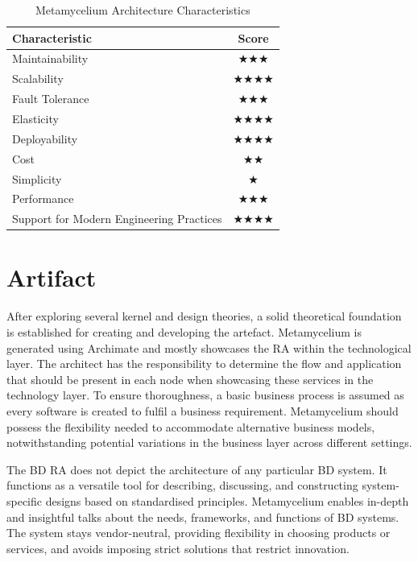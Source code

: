 \documentclass[preprint,12pt]{elsarticle}
\begin{document}
\begin{table}[t]
  \centering
  \caption{Metamycelium Architecture Characteristics}
  \label{tab:architecture-characteristics}
  \begin{tabular}{|l|c|}
    \hline
    \textbf{Characteristic} & \textbf{Score} \\
    \hline
    Maintainability & $\bigstar\bigstar\bigstar$ \\
    \hline
    Scalability & $\bigstar\bigstar\bigstar\bigstar$ \\
    \hline
    Fault Tolerance & $\bigstar\bigstar\bigstar$ \\
    \hline
    Elasticity & $\bigstar\bigstar\bigstar\bigstar$ \\
    \hline
    Deployability & $\bigstar\bigstar\bigstar\bigstar$ \\
    \hline
    Cost & $\bigstar\bigstar$ \\
    \hline
    Simplicity & $\bigstar$ \\
    \hline
    Performance & $\bigstar\bigstar\bigstar$ \\
    \hline
    Support for Modern Engineering Practices & $\bigstar\bigstar\bigstar\bigstar$ \\
    \hline
  \end{tabular}
\end{table}









\section{Artifact}
\label{sec:artifact}

After exploring several kernel and design theories, a solid theoretical foundation is established for creating and developing the artefact. Metamycelium is generated using Archimate and mostly showcases the RA within the technological layer. The architect has the responsibility to determine the flow and application that should be present in each node when showcasing these services in the technology layer. To ensure thoroughness, a basic business process is assumed as every software is created to fulfil a business requirement. Metamycelium should possess the flexibility needed to accommodate alternative business models, notwithstanding potential variations in the business layer across different settings.

The BD RA does not depict the architecture of any particular BD system. It functions as a versatile tool for describing, discussing, and constructing system-specific designs based on standardised principles. Metamycelium enables in-depth and insightful talks about the needs, frameworks, and functions of BD systems. The system stays vendor-neutral, providing flexibility in choosing products or services, and avoids imposing strict solutions that restrict innovation. 
\end{document}
